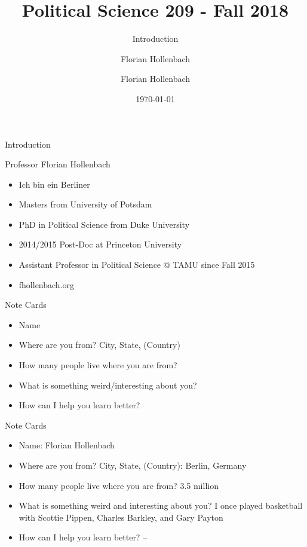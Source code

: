 \documentclass[presentation]{beamer}
\author{Florian Hollenbach}
\author{Florian Hollenbach}
\date{\today}
\title{Political Science 209 - Fall 2018}
\subtitle{Introduction}
\begin{document}
\maketitle


\begin{frame}[label={sec:orgbd6e434}]{Introduction}
\begin{block}{Professor Florian Hollenbach}
\begin{itemize}
\item Ich bin ein Berliner
\item Masters from University of Potsdam
\item PhD in Political Science from Duke University
\item 2014/2015 Post-Doc at Princeton University
\item Assistant Professor in Political Science @ TAMU since Fall 2015
\item fhollenbach.org
\end{itemize}
\end{block}
\end{frame}


\begin{frame}[label={sec:org114ab16}]{Note Cards}
\begin{itemize}
\item Name

\item Where are you from? City, State, (Country)

\item How many people live where you are from?

\item What is something weird/interesting about you?

\item How can I help you learn better?
\end{itemize}
\end{frame}

\begin{frame}[label={sec:org16aa20c}]{Note Cards}
\begin{itemize}
\item Name: Florian Hollenbach

\item Where are you from? City, State, (Country): Berlin, Germany

\item How many people live where you are from? 3.5 million

\item What is something weird and interesting about you? I once played basketball with Scottie Pippen, Charles Barkley, and Gary Payton

\item How can I help you learn better?  --
\end{itemize}
\end{frame}
\end{document}
